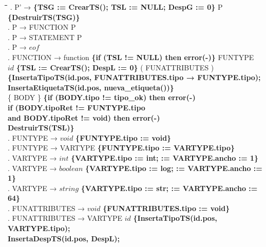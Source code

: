 \begin{tabbing}
    \hspace{1cm}\=\hspace{4.5cm}\=\hspace{2cm}\=\hspace{1cm}\=\hspace{1cm}\=\kill
    . P' → \textbf{\{TSG := CrearTS(); TSL := NULL; DespG := 0\}} P \textbf{\{DestruirTS(TSG)\}}\\
    . P → FUNCTION P\\
    . P → STATEMENT P\\
    . P → $eof$\\
    . FUNCTION → \>function \textbf{\{if (TSL != NULL) then error(-)\}} FUNTYPE\\
    \>              \>$id$ \textbf{\{TSL := CrearTS(); DespL := 0\}} ( FUNATTRIBUTES )\\
    \>              \>\textbf{\{InsertaTipoTS(id.pos, FUNATTRIBUTES.tipo → FUNTYPE.tipo);}\\
    \>              \>\textbf{ InsertaEtiquetaTS(id.pos, nueva\_etiqueta())\}}\\
    \>              \>\{ BODY \}\> \textbf{\{if (BODY.tipo != tipo\_ok) then error(-) }\\
    \>              \>          \> \textbf{ if (BODY.tipoRet != FUNTYPE.tipo}\\
    \>              \>          \>             \>\textbf{and BODY.tipoRet != void) then error(-)}\\
    \>              \>          \> \textbf{DestruirTS(TSL)\}}\\
    . FUNTYPE → $void$ \textbf{\{FUNTYPE.tipo := void\}}\\
    . FUNTYPE → VARTYPE \textbf{\{FUNTYPE.tipo := VARTYPE.tipo\}}\\
    . VARTYPE → $int$ \textbf{\{VARTYPE.tipo := int; := VARTYPE.ancho := 1\}}\\
    . VARTYPE → $boolean$ \textbf{\{VARTYPE.tipo := log; := VARTYPE.ancho := 1\}}\\
    . VARTYPE → $string$ \textbf{\{VARTYPE.tipo := str; := VARTYPE.ancho := 64\}}\\
    . FUNATTRIBUTES → $void$ \textbf{\{FUNATTRIBUTES.tipo := void\}}\\
    . FUNATTRIBUTES → \>VARTYPE $id$ \textbf{\{InsertaTipoTS(id.pos, VARTYPE.tipo);}\\
    \>                    \>        \>\textbf{InsertaDespTS(id.pos, DespL);}\\

\end{tabbing}
